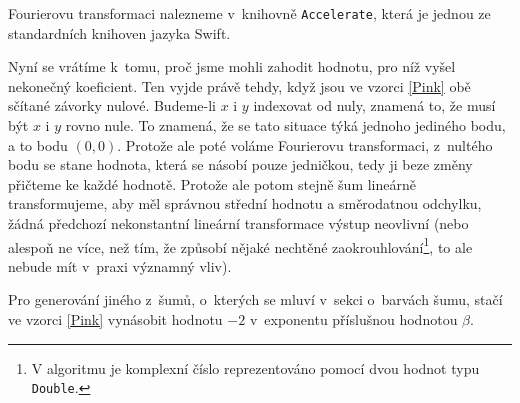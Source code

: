 Fourierovu transformaci nalezneme v~knihovně {\tt Accelerate}, která je jednou ze
standardních knihoven jazyka Swift.

Nyní se vrátíme k~tomu, proč jsme mohli zahodit hodnotu, pro níž vyšel
nekonečný koeficient. Ten vyjde právě tehdy, když jsou ve vzorci \eqref{Pink}
obě sčítané závorky nulové. Budeme-li $x$ i $y$ indexovat od nuly, znamená to,
že musí být $x$ i $y$ rovno nule. To znamená, že se tato situace týká jednoho
jediného bodu, a to bodu $(0,0)$. Protože ale poté voláme Fourierovu
transformaci, z~nultého bodu se stane hodnota, která se násobí pouze jedničkou,
tedy ji beze změny přičteme ke každé hodnotě. Protože ale potom stejně šum
lineárně transformujeme, aby měl správnou střední hodnotu a směrodatnou
odchylku, žádná předchozí nekonstantní lineární transformace výstup neovlivní
(nebo alespoň ne více, než tím, že způsobí nějaké nechtěné
zaokrouhlování\footnote{V algoritmu je komplexní číslo reprezentováno pomocí
dvou hodnot typu {\tt Double}.}, to ale nebude mít v~praxi významný vliv).

Pro generování jiného z~šumů, o~kterých se mluví v~sekci o~barvách šumu, stačí 
ve vzorci \eqref{Pink} vynásobit hodnotu $-2$ v~exponentu příslušnou hodnotou $\beta$.
